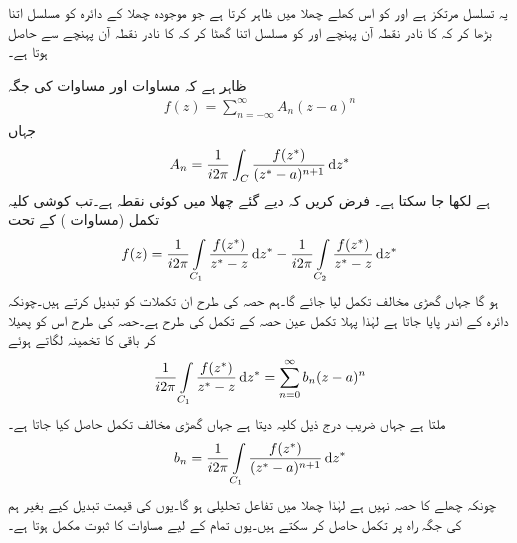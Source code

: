 یہ تسلسل مرتکز ہے اور  کو اس کھلے چھلا میں ظاہر کرتا ہے جو موجودہ چھلا کے دائرہ   کو مسلسل اتنا بڑھا کر کہ  کا نادر نقطہ آن پہنچے  اور  کو مسلسل اتنا گھٹا کر کہ  کا نادر نقطہ آن پہنچے سے حاصل ہوتا ہے۔

ظاہر ہے کہ مساوات  اور مساوات  کی جگہ
\begin{align}\label{مساوات_ٹیلر_لوغوں_تسلسل_الف_الف}
f(z)=\sum\limits_{n=-\infty}^{\infty} A_n(z-a)^n
\end{align}
جہاں
\begin{align}\label{مساوات_ٹیلر_لوغوں_تسلسل_ب_ب}
A_n=\frac{1}{i2\pi}\int_C \frac{f(z^*)}{(z^*-a)^{n+1}}\dif z^*
\end{align}
ہے لکھا جا سکتا ہے۔
\quad
فرض کریں کہ دیے گئے چھلا میں  کوئی نقطہ ہے۔تب کوشی کلیہ تکمل (مساوات ) کے تحت
\begin{align}\label{مساوات_ٹیلر_لوغوں_تسلسل_پ}
f(z)=\frac{1}{i2\pi}\int\limits_{C_1} \frac{f(z^*)}{z^*-z}\dif z^*-\frac{1}{i2\pi}\int\limits_{C_2}\frac{f(z^*)}{z^*-z}\dif z^*
\end{align}
ہو گا جہاں گھڑی مخالف  تکمل لیا جائے گا۔ہم حصہ  کی طرح ان تکملات کو تبدیل کرتے ہیں۔چونکہ  دائرہ  کے اندر پایا جاتا ہے لہٰذا پہلا تکمل عین حصہ  کے تکمل کی طرح ہے۔حصہ  کی طرح اس کو پھیلا کر باقی کا تخمینہ لگاتے ہوئے
\begin{align}
\frac{1}{i2\pi}\int\limits_{C_1}\frac{f(z^*)}{z^*-z}\dif z^*=\sum\limits_{n=0}^{\infty} b_n(z-a)^n
\end{align}
ملتا ہے جہاں  ضریب  درج ذیل کلیہ دیتا ہے جہاں گھڑی مخالف  تکمل حاصل کیا جاتا ہے۔
\begin{align}
b_n=\frac{1}{i2\pi}\int\limits_{C_1} \frac{f(z^*)}{(z^*-a)^{n+1}}\dif z^*
\end{align}
چونکہ  چھلے کا حصہ نہیں ہے لہٰذا چھلا میں  تفاعل   تحلیلی ہو گا۔یوں  کی قیمت تبدیل کیے بغیر ہم  کی جگہ راہ  پر تکمل حاصل کر سکتے ہیں۔یوں تمام  کے لیے مساوات  کا ثبوت مکمل ہوتا ہے۔

